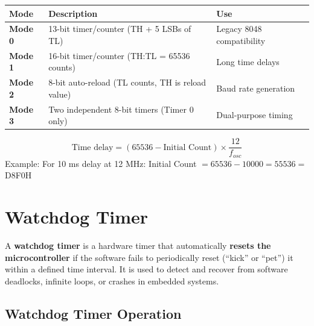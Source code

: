 \documentclass[12pt,a4paper]{article}
\renewcommand{\arraystretch}{1.45}
\begin{document}
\par\noindent
{\renewcommand{\arraystretch}{1.55}%
\begin{tabularx}{\linewidth}{|B{2.5cm}|Y|Y|}
\hline
\textbf{Mode} & \textbf{Description} & \textbf{Use} \\
\hline
\textbf{Mode 0} & 13-bit timer/counter (TH + 5 LSBs of TL) & Legacy 8048 compatibility \\
\hline
\textbf{Mode 1} & 16-bit timer/counter (TH:TL = 65536 counts) & Long time delays \\
\hline
\textbf{Mode 2} & 8-bit auto-reload (TL counts, TH is reload value) & Baud rate generation \\
\hline
\textbf{Mode 3} & Two independent 8-bit timers (Timer 0 only) & Dual-purpose timing \\
\hline
\end{tabularx}}

\begin{tcolorbox}[formulabox, title={\textbf{Timer Delay Calculation (8051, Mode 1)}}]
\[
\text{Time delay} = (65536 - \text{Initial Count}) \times \frac{12}{f_{osc}}
\]
Example: For 10 ms delay at 12 MHz: Initial Count $= 65536 - 10000 = 55536 =$ D8F0H
\end{tcolorbox}

\section{Watchdog Timer}

\begin{tcolorbox}[defbox, title={\textbf{Watchdog Timer (WDT)}}]
A \textbf{watchdog timer} is a hardware timer that automatically \textbf{resets the microcontroller} if the software fails to periodically reset (``kick'' or ``pet'') it within a defined time interval. It is used to detect and recover from software deadlocks, infinite loops, or crashes in embedded systems.
\end{tcolorbox}

\subsection{Watchdog Timer Operation}
\end{document}
